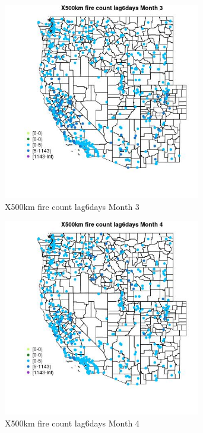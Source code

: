 \begin{figure} 
\centering  
\includegraphics[width=0.77\textwidth]{Code_Outputs/Report_ML_input_PM25_Step4_part_e_de_duplicated_aves_compiled_2019-05-14wNAs_MapObsMo3X500km_fire_count_lag6days.jpg} 
\caption{\label{fig:Report_ML_input_PM25_Step4_part_e_de_duplicated_aves_compiled_2019-05-14wNAsMapObsMo3X500km_fire_count_lag6days}X500km fire count lag6days Month 3} 
\end{figure} 
 

\begin{figure} 
\centering  
\includegraphics[width=0.77\textwidth]{Code_Outputs/Report_ML_input_PM25_Step4_part_e_de_duplicated_aves_compiled_2019-05-14wNAs_MapObsMo4X500km_fire_count_lag6days.jpg} 
\caption{\label{fig:Report_ML_input_PM25_Step4_part_e_de_duplicated_aves_compiled_2019-05-14wNAsMapObsMo4X500km_fire_count_lag6days}X500km fire count lag6days Month 4} 
\end{figure} 
 

